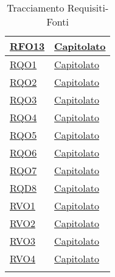 \begin{longtable}{|>{\centering}m{5cm}|m{5cm}<{\centering}|}
\hyperlink{RFO13}{RFO13} & \hyperlink{Capitolato}{Capitolato}\\
\hline

 \hyperlink{RQO1}{RQO1} & \hyperlink{Capitolato}{Capitolato}\\
\hline

 \hyperlink{RQO2}{RQO2} & \hyperlink{Capitolato}{Capitolato}\\
\hline

 \hyperlink{RQO3}{RQO3} & \hyperlink{Capitolato}{Capitolato}\\
\hline

 \hyperlink{RQO4}{RQO4} & \hyperlink{Capitolato}{Capitolato}\\
\hline

 \hyperlink{RQO5}{RQO5} & \hyperlink{Capitolato}{Capitolato}\\
\hline

 \hyperlink{RQO6}{RQO6} & \hyperlink{Capitolato}{Capitolato}\\
\hline

 \hyperlink{RQO7}{RQO7} & \hyperlink{Capitolato}{Capitolato}\\
\hline

 \hyperlink{RQD8}{RQD8} & \hyperlink{Capitolato}{Capitolato}\\
\hline

 \hyperlink{RVO1}{RVO1} & \hyperlink{Capitolato}{Capitolato}\\
\hline

 \hyperlink{RVO2}{RVO2} & \hyperlink{Capitolato}{Capitolato}\\
\hline

 \hyperlink{RVO3}{RVO3} & \hyperlink{Capitolato}{Capitolato}\\
\hline

 \hyperlink{RVO4}{RVO4} & \hyperlink{Capitolato}{Capitolato}\\
\hline

\caption[Tracciamento Requisiti-Fonti]{Tracciamento Requisiti-Fonti}
\label{tabella:requi-fonti}
\end{longtable}
\clearpage
